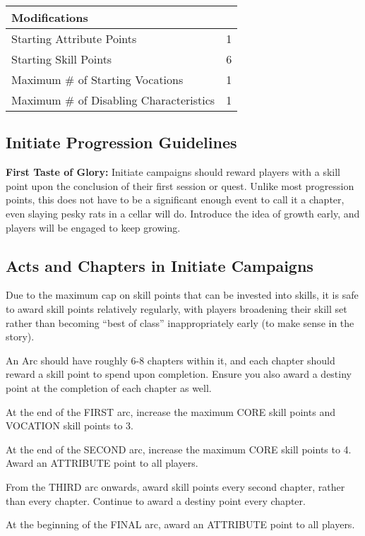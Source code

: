 \begin{center}
    \begin{xltabular}{\textwidth}{|l c|} 
        \hline 
        \textbf{Modifications} &  \\
        \hline
        Starting Attribute Points & 1 \\
        Starting Skill Points & 6 \\ 
        Maximum \# of Starting Vocations & 1 \\
        Maximum \# of Disabling Characteristics & 1 \\
        \hline
    \end{xltabular}
\end{center}

\subsection{Initiate Progression Guidelines}

\textbf{First Taste of Glory:} Initiate campaigns should reward players with a skill point upon the conclusion of their first session or quest. Unlike most progression points, this does not have to be a significant enough event to call it a chapter, even slaying pesky rats in a cellar will do. Introduce the idea of growth early, and players will be engaged to keep growing.

\subsection{Acts and Chapters in Initiate Campaigns}

Due to the maximum cap on skill points that can be invested into skills, it is safe to award skill points relatively regularly, with players broadening their skill set rather than becoming “best of class” inappropriately early (to make sense in the story).

An Arc should have roughly 6-8 chapters within it, and each chapter should reward a skill point to spend upon completion. Ensure you also award a destiny point at the completion of each chapter as well.

\begin{displayquote}
    At the end of the FIRST arc, increase the maximum CORE skill points and VOCATION skill points to 3.

    At the end of the SECOND arc, increase the maximum CORE skill points to 4. Award an ATTRIBUTE point to all players.

    From the THIRD arc onwards, award skill points every second chapter, rather than every chapter. Continue to award a destiny point every chapter.

    At the beginning of the FINAL arc, award an ATTRIBUTE point to all players.
\end{displayquote}

